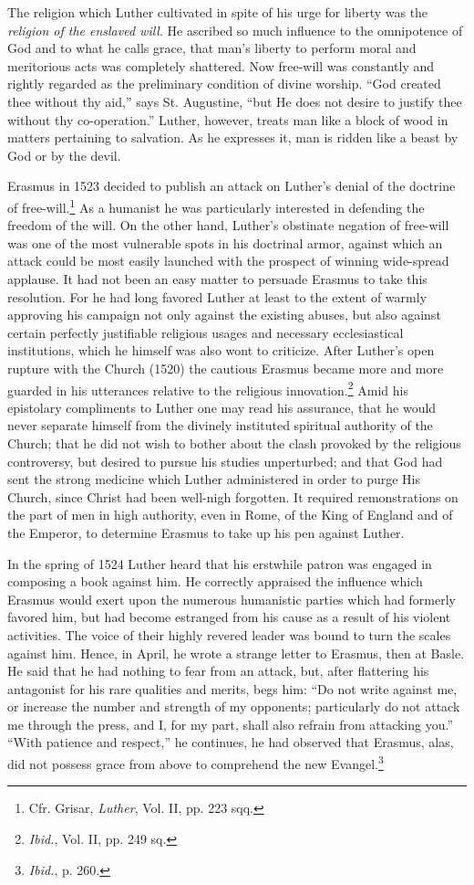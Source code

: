 The religion which Luther cultivated in spite of his urge for
liberty was the \textit{religion of the enslaved will}. He ascribed so much
influence to the omnipotence of God and to what he calls grace,
that man’s liberty to perform moral and meritorious acts was completely
shattered. Now free-will was constantly and rightly regarded
as the preliminary condition of divine worship. “God created thee
without thy aid,” says St. Augustine, “but He does not desire to
justify thee without thy co-operation.” Luther, however, treats
man like a block of wood in matters pertaining to salvation. As
he expresses it, man is ridden like a beast by God or by the devil.

Erasmus in 1523 decided to publish an attack on Luther’s denial
of the doctrine of free-will.\footnote{Cfr. Grisar, \textit{Luther}, Vol. II, pp. 223 sqq.}
As a humanist he was particularly
interested in defending the freedom of the will. On the other hand,
Luther’s obstinate negation of free-will was one of the most vulnerable
spots in his doctrinal armor, against which an attack could
be most easily launched with the prospect of winning wide-spread
applause. It had not been an easy matter to persuade Erasmus to
take this resolution. For he had long favored Luther at least to the
extent of warmly approving his campaign not only against the
existing abuses, but also against certain perfectly justifiable religious
usages and necessary ecclesiastical institutions, which he himself
was also wont to criticize. After Luther’s open rupture with the
Church (1520) the cautious Erasmus became more and more guarded
in his utterances relative to the religious innovation.\footnote
{\textit{Ibid.}, Vol. II, pp. 249 sq.}
Amid his
epistolary compliments to Luther one may read his assurance, that
he would never separate himself from the divinely instituted spiritual
authority of the Church; that he did not wish to bother about
the clash provoked by the religious controversy, but desired to pursue
his studies unperturbed; and that God had sent the strong medicine
which Luther administered in order to purge His Church, since
Christ had been well-nigh forgotten. It required remonstrations on
the part of men in high authority, even in Rome, of the King of
England and of the Emperor, to determine Erasmus to take up his
pen against Luther.

In the spring of 1524 Luther heard that his erstwhile patron was
engaged in composing a book against him. He correctly appraised
the influence which Erasmus would exert upon the numerous humanistic
parties which had formerly favored him, but had become
estranged from his cause as a result of his violent activities. The
voice of their highly revered leader was bound to turn the scales
against him. Hence, in April, he wrote a strange letter to Erasmus,
then at Basle. He said that he had nothing to fear from an attack, but,
after flattering his antagonist for his rare qualities and merits, begs
him: “Do not write against me, or increase the number and strength
of my opponents; particularly do not attack me through the press,
and I, for my part, shall also refrain from attacking you.” “With patience
and respect,” he continues, he had observed that Erasmus, alas,
did not possess grace from above to comprehend the new Evangel.\footnote{\textit{Ibid.}, p. 260.}

